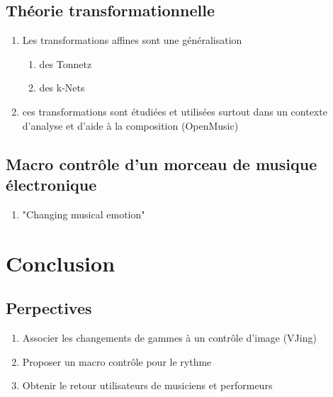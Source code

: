 \documentclass[french,11pt]{article}
\begin{document}
\subsection{Théorie transformationnelle}
\begin{enumerate}
  \item Les transformations affines sont une généralisation 
  \begin{enumerate}
    \item des Tonnetz
    \item des k-Nets
  \end{enumerate}
  \item ces transformations sont étudiées et utilisées surtout dans un contexte d'analyse et d'aide à la composition (OpenMusic)
\end{enumerate}

\subsection{Macro contrôle d'un morceau de musique électronique}
\begin{enumerate}
  \item "Changing musical emotion"
\end{enumerate}

\section{Conclusion}
\subsection{Perpectives}
\begin{enumerate}
  \item Associer les changements de gammes à un contrôle d'image (VJing)
  \item Proposer un macro contrôle pour le rythme
  \item Obtenir le retour utilisateurs de musiciens et performeurs
\end{enumerate}
\newpage
\printbibliography
\end{document}

